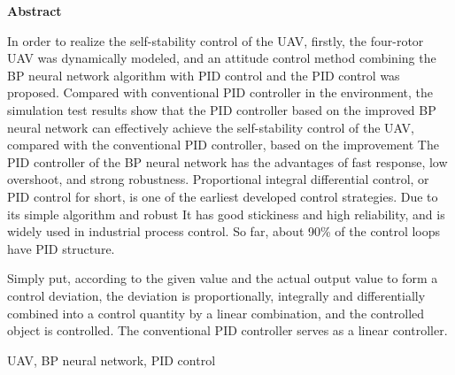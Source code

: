 \begin{center}
   \large{\textbf{Abstract}}
\end{center}
\begin{adjustwidth}{0cm}{0cm}
   \hspace{1.5em}In order to realize the self-stability control of the UAV, firstly, the four-rotor UAV was dynamically modeled, and an attitude control method combining the BP neural network algorithm with PID control and the PID control was proposed. Compared with conventional PID controller in the environment, the simulation test results show that the PID controller based on the improved BP neural network can effectively achieve the self-stability control of the UAV, compared with the conventional PID controller, based on the improvement The PID controller of the BP neural network has the advantages of fast response, low overshoot, and strong robustness. Proportional integral differential control, or PID control for short, is one of the earliest developed control strategies. Due to its simple algorithm and robust It has good stickiness and high reliability, and is widely used in industrial process control. So far, about 90\% of the control loops have PID structure.\par
   \noindent\hspace{1.5em}Simply put, according to the given value and the actual output value to form a control deviation, the deviation is proportionally, integrally and differentially combined into a control quantity by a linear combination, and the controlled object is controlled. The conventional PID controller serves as a linear controller. \par
\end{adjustwidth}
\begin{keywords}
   \noindent UAV, BP neural network, PID control          
\end{keywords}
\thispagestyle{empty} %